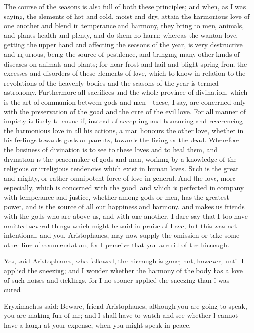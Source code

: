 \documentclass[11pt,letter]{article}
\begin{document}
\par  The course of the seasons is also full of both these principles; and when, as I was saying, the elements of hot and cold, moist and dry, attain the harmonious love of one another and blend in temperance and harmony, they bring to men, animals, and plants health and plenty, and do them no harm; whereas the wanton love, getting the upper hand and affecting the seasons of the year, is very destructive and injurious, being the source of pestilence, and bringing many other kinds of diseases on animals and plants; for hoar-frost and hail and blight spring from the excesses and disorders of these elements of love, which to know in relation to the revolutions of the heavenly bodies and the seasons of the year is termed astronomy. Furthermore all sacrifices and the whole province of divination, which is the art of communion between gods and men—these, I say, are concerned only with the preservation of the good and the cure of the evil love. For all manner of impiety is likely to ensue if, instead of accepting and honouring and reverencing the harmonious love in all his actions, a man honours the other love, whether in his feelings towards gods or parents, towards the living or the dead. Wherefore the business of divination is to see to these loves and to heal them, and divination is the peacemaker of gods and men, working by a knowledge of the religious or irreligious tendencies which exist in human loves. Such is the great and mighty, or rather omnipotent force of love in general. And the love, more especially, which is concerned with the good, and which is perfected in company with temperance and justice, whether among gods or men, has the greatest power, and is the source of all our happiness and harmony, and makes us friends with the gods who are above us, and with one another. I dare say that I too have omitted several things which might be said in praise of Love, but this was not intentional, and you, Aristophanes, may now supply the omission or take some other line of commendation; for I perceive that you are rid of the hiccough.

\par  Yes, said Aristophanes, who followed, the hiccough is gone; not, however, until I applied the sneezing; and I wonder whether the harmony of the body has a love of such noises and ticklings, for I no sooner applied the sneezing than I was cured.

\par  Eryximachus said: Beware, friend Aristophanes, although you are going to speak, you are making fun of me; and I shall have to watch and see whether I cannot have a laugh at your expense, when you might speak in peace.
\end{document}
